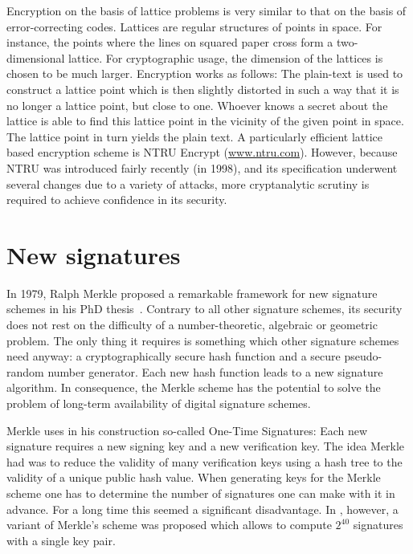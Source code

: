 Encryption on the basis of lattice problems
is very similar to that on the basis of
error-correcting codes.  Lattices are regular
structures of points in space.  For instance, the
points where the lines on squared paper cross form
a two-dimensional lattice.  For cryptographic
usage, the dimension of the lattices is chosen to
be much larger.  Encryption works as follows: The
plain-text is used to construct a lattice point
which is then slightly distorted in such a way
that it is no longer a lattice point, but close to
one.  Whoever knows a secret about the lattice is
able to find this lattice point in the vicinity of
the given point in space.  The lattice point in
turn yields the plain text.  A particularly
efficient lattice based encryption scheme is NTRU
Encrypt (\url{www.ntru.com}).
However, because
NTRU was introduced fairly recently (in 1998), and
its specification underwent several changes due to
a variety of attacks, more cryptanalytic scrutiny
is required to achieve confidence in its security.

\section{New signatures}
\label{sec:signatures}

In 1979, Ralph Merkle proposed a remarkable
framework for new signature schemes in his PhD
thesis~\cite{merkle-thesis:1979}.
Contrary to all other signature schemes, its
security does not rest on the difficulty of a
number-theoretic, algebraic or geometric problem.
The only thing it requires is something which
other signature schemes need anyway: a
cryptographically secure hash function and a
secure pseudo-random number generator.  Each new
hash function leads to a new signature algorithm.
In consequence, the Merkle scheme has the
potential to solve the problem of long-term
availability of digital signature schemes.

Merkle uses in his construction so-called One-Time
Signatures: Each new signature requires a new
signing key and a new verification key.  The idea
Merkle had was to reduce the validity of many
verification keys using a hash tree to the
validity of a unique public hash value.  When
generating keys for the Merkle scheme one has to
determine the number of signatures one can make
with it in advance.  For a long time this seemed a
significant disadvantage.  In
\cite{buchmann/coronado/dahmen/doering/klintsevich:2006},
however, a variant of Merkle's scheme was proposed
which allows to compute $2^{40}$ signatures with a
single key pair.


